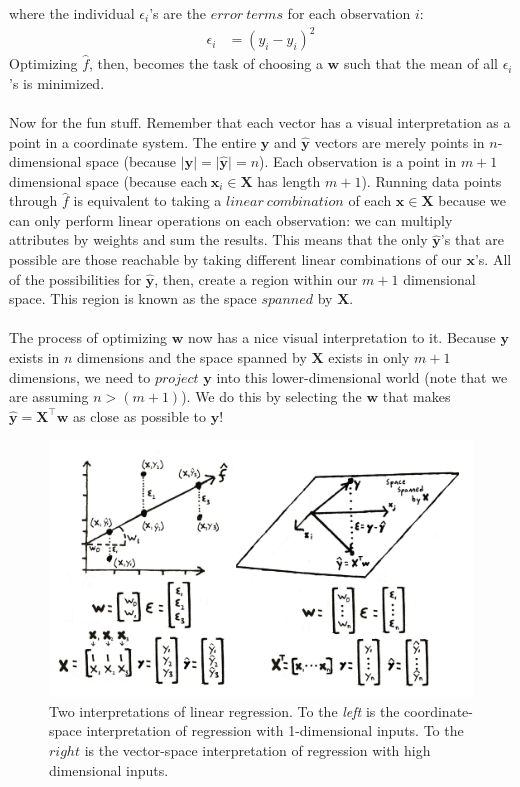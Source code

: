 \documentclass[a4paper]{article}
\begin{document}
\noindent where the individual $\epsilon_i$'s are the $error\ terms$ for each observation $i$:
\begin{align*}
\epsilon_i &= (y_i - \hat{y}_i)^2
\end{align*} 
\noindent Optimizing $\hat{f}$, then, becomes the task of choosing a $\bm{w}$ such that the mean of all $\epsilon_i$'s is minimized. 
\\ \\
\noindent Now for the fun stuff. Remember that each vector has a visual interpretation as a point in a coordinate system. The entire $\bm{y}$ and $\bm{\hat{y}}$ vectors are merely points in $n$-dimensional space (because $\vert \bm{y}\vert = \vert\bm{\hat{y}}\vert = n$). Each observation is a point in $m+1$ dimensional space (because each$\ \bm{x}_i \in \bm{X}$ has length $m+1$). Running data points through $\hat{f}$ is equivalent to taking a $linear\ combination$ of each $\bm{x} \in \bm{X}$ because we can only perform linear operations on each observation: we can multiply attributes by weights and sum the results. This means that the only $\bm{\hat{y}}$'s that are possible are those reachable by taking different linear combinations of our $\bm{x}$'s. All of the possibilities for $\bm{\hat{y}}$, then, create a region within our $m+1$ dimensional space. This region is known as the space $spanned$ by $\bm{X}$. 
\\ \\
\noindent The process of optimizing $\bm{w}$ now has a nice visual interpretation to it. Because $\bm{y}$ exists in $n$ dimensions and the space spanned by $\bm{X}$ exists in only $m+1$ dimensions, we need to $project$ $\bm{y}$ into this lower-dimensional world (note that we are assuming $n > (m +1)$). We do this by selecting the $\bm{w}$ that makes $\bm{\hat{y}} = \bm{X}^{\intercal} \bm{w}$ as close as possible to $\bm{y}$!
\begin{figure}[H]
  \centering
  \includegraphics[width=6in]{figures/chap1/regression_projection}
  \caption{Two interpretations of linear regression. To the {\it left} is the coordinate-space interpretation of regression with 1-dimensional inputs. To the $right$ is the vector-space interpretation of regression with high dimensional inputs.}
\end{figure}
\end{document}
